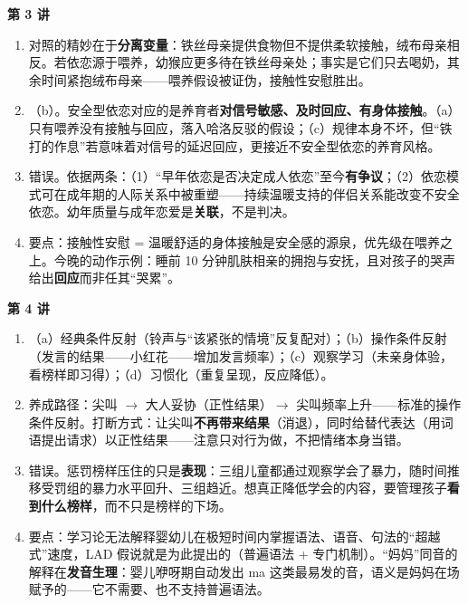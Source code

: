 \documentclass[UTF8,a4paper,11pt]{ctexart}
\begin{document}
\textbf{第 3 讲}
\begin{enumerate}
  \item 对照的精妙在于\textbf{分离变量}：铁丝母亲提供食物但不提供柔软接触，绒布母亲相反。若依恋源于喂养，幼猴应更多待在铁丝母亲处；事实是它们只去喝奶，其余时间紧抱绒布母亲——喂养假设被证伪，接触性安慰胜出。
  \item （b）。安全型依恋对应的是养育者\textbf{对信号敏感、及时回应、有身体接触}。（a）只有喂养没有接触与回应，落入哈洛反驳的假设；（c）规律本身不坏，但“铁打的作息”若意味着对信号的延迟回应，更接近不安全型依恋的养育风格。
  \item 错误。依据两条：（1）“早年依恋是否决定成人依恋”至今\textbf{有争议}；（2）依恋模式可在成年期的人际关系中被重塑——持续温暖支持的伴侣关系能改变不安全依恋。幼年质量与成年恋爱是\textbf{关联}，不是判决。
  \item 要点：接触性安慰 = 温暖舒适的身体接触是安全感的源泉，优先级在喂养之上。今晚的动作示例：睡前 10 分钟肌肤相亲的拥抱与安抚，且对孩子的哭声给出\textbf{回应}而非任其“哭累”。
\end{enumerate}

\textbf{第 4 讲}
\begin{enumerate}
  \item （a）经典条件反射（铃声与“该紧张的情境”反复配对）；（b）操作条件反射（发言的结果——小红花——增加发言频率）；（c）观察学习（未亲身体验，看榜样即习得）；（d）习惯化（重复呈现，反应降低）。
  \item 养成路径：尖叫 $\rightarrow$ 大人妥协（正性结果）$\rightarrow$ 尖叫频率上升——标准的操作条件反射。打断方式：让尖叫\textbf{不再带来结果}（消退），同时给替代表达（用词语提出请求）以正性结果——注意只对行为做，不把情绪本身当错。
  \item 错误。惩罚榜样压住的只是\textbf{表现}：三组儿童都通过观察学会了暴力，随时间推移受罚组的暴力水平回升、三组趋近。想真正降低学会的内容，要管理孩子\textbf{看到什么榜样}，而不只是榜样的下场。
  \item 要点：学习论无法解释婴幼儿在极短时间内掌握语法、语音、句法的“超越式”速度，LAD 假说就是为此提出的（普遍语法 + 专门机制）。“妈妈”同音的解释在\textbf{发音生理}：婴儿咿呀期自动发出 ma 这类最易发的音，语义是妈妈在场赋予的——它不需要、也不支持普遍语法。
\end{enumerate}
\end{document}
